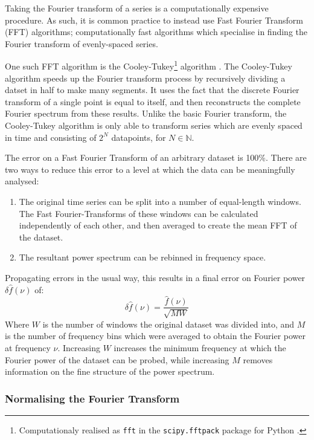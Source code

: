 \par Taking the Fourier transform of a series is a computationally expensive procedure.  As such, it is common practice to instead use Fast Fourier Transform (FFT) algorithms; computationally fast algorithms which specialise in finding the Fourier transform of evenly-spaced series.
\par One such FFT algorithm is the Cooley-Tukey\footnote{Computationaly realised as \texttt{fft} in the \texttt{scipy.fftpack} package for Python \citep{NumPy}.} algorithm \citep{Cooley_FFT}.  The Cooley-Tukey algorithm speeds up the Fourier transform process by recursively dividing a datset in half to make many segments.  It uses the fact that the discrete Fourier transform of a single point is equal to itself, and then reconstructs the complete Fourier spectrum from these results. Unlike the basic Fourier transform, the Cooley-Tukey algorithm is only able to transform series which are evenly spaced in time and consisting of $2^N$ datapoints, for $N\in\mathbb{N}$.
\par The error on a Fast Fourier Transform of an arbitrary dataset is 100\%.  There are two ways to reduce this error to a level at which the data can be meaningfully analysed:
\begin{enumerate}
\item The original time series can be split into a number of equal-length windows.  The Fast Fourier-Transforms of these windows can be calculated independently of each other, and then averaged to create the mean FFT of the dataset.
\item The resultant power spectrum can be rebinned in frequency space.
\end{enumerate}
\par Propagating errors in the usual way, this results in a final error on Fourier power $\delta\hat{f}(\nu)$ of:
\begin{equation}
\delta\hat{f}(\nu)=\frac{\hat{f}(\nu)}{\sqrt{MW}}
\end{equation}
Where $W$ is the number of windows the original dataset was divided into, and $M$ is the number of frequency bins which were averaged to obtain the Fourier power at frequency $\nu$.  Increasing $W$ increases the minimum frequency at which the Fourier power of the dataset can be probed, while increasing $M$ removes information on the fine structure of the power spectrum.

\subsubsection{Normalising the Fourier Transform}

